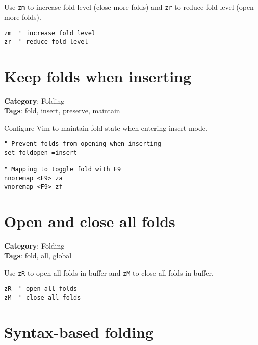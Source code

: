 {{{{{{Use {\footnotesize \Verb§zm§} to increase fold level (close more folds) and {\footnotesize \Verb§zr§} to reduce fold level (open more folds).

\begin{Exa*}{}
\begin{Verbatim}[fontsize=\footnotesize, breaklines, breakanywhere]
zm  " increase fold level
zr  " reduce fold level
\end{Verbatim}
\end{Exa*}

\section{Keep folds when inserting}

\textbf{Category}: Folding\\ \textbf{Tags}: fold, insert, preserve, maintain
\vspace{0.5cm}

Configure Vim to maintain fold state when entering insert mode.

\begin{Exa*}{}
\begin{Verbatim}[fontsize=\footnotesize, breaklines, breakanywhere]
" Prevent folds from opening when inserting
set foldopen-=insert

" Mapping to toggle fold with F9
nnoremap <F9> za
vnoremap <F9> zf
\end{Verbatim}
\end{Exa*}

\section{Open and close all folds}

\textbf{Category}: Folding\\ \textbf{Tags}: fold, all, global
\vspace{0.5cm}

Use {\footnotesize \Verb§zR§} to open all folds in buffer and {\footnotesize \Verb§zM§} to close all folds in buffer.

\begin{Exa*}{}
\begin{Verbatim}[fontsize=\footnotesize, breaklines, breakanywhere]
zR  " open all folds
zM  " close all folds
\end{Verbatim}
\end{Exa*}

\section{Syntax-based folding}

}}}}}}
